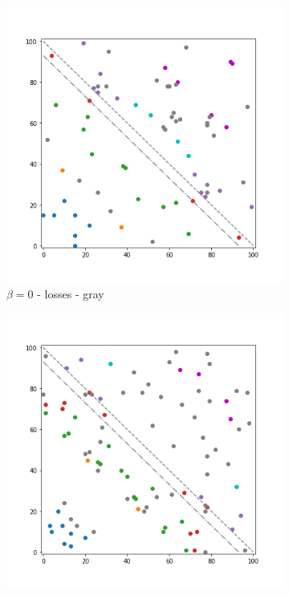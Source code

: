 \begin{figure}[!ht]
	\centering
	\begin{subfigure}{.3\textwidth}%
    	\centering
    	\includegraphics[width=1\linewidth]{Bilder/simulation_2_4}
    	\caption{$\beta=0$ - losses - gray}
	\end{subfigure}%
	\begin{subfigure}{.3\textwidth}%
    	\centering
    	\includegraphics[width=1\linewidth]{Bilder/simulation_3_4}

\end{subfigure}
\end{figure}
